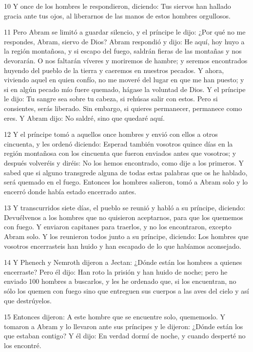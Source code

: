 \par 10 Y once de los hombres le respondieron, diciendo: Tus siervos han hallado gracia ante tus ojos, al liberarnos de las manos de estos hombres orgullosos.

\par 11 Pero Abram se limitó a guardar silencio, y el príncipe le dijo: ¿Por qué no me respondes, Abram, siervo de Dios? Abram respondió y dijo: He aquí, hoy huyo a la región montañosa, y si escapo del fuego, saldrán fieras de las montañas y nos devorarán. O nos faltarán víveres y moriremos de hambre; y seremos encontrados huyendo del pueblo de la tierra y caeremos en nuestros pecados. Y ahora, viviendo aquel en quien confío, no me moveré del lugar en que me han puesto; y si en algún pecado mío fuere quemado, hágase la voluntad de Dios. Y el príncipe le dijo: Tu sangre sea sobre tu cabeza, si rehúsas salir con estos. Pero si consientes, serás liberado. Sin embargo, si quieres permanecer, permanece como eres. Y Abram dijo: No saldré, sino que quedaré aquí.

\par 12 Y el príncipe tomó a aquellos once hombres y envió con ellos a otros cincuenta, y les ordenó diciendo: Esperad también vosotros quince días en la región montañosa con los cincuenta que fueron enviados antes que vosotros; y después volveréis y diréis: No los hemos encontrado, como dije a los primeros. Y sabed que si alguno transgrede alguna de todas estas palabras que os he hablado, será quemado en el fuego. Entonces los hombres salieron, tomó a Abram solo y lo encerró donde había estado encerrado antes.

\par 13 Y transcurridos siete días, el pueblo se reunió y habló a su príncipe, diciendo: Devuélvenos a los hombres que no quisieron aceptarnos, para que los quememos con fuego. Y enviaron capitanes para traerlos, y no los encontraron, excepto Abram solo. Y los reunieron todos junto a su príncipe, diciendo: Los hombres que vosotros encerrasteis han huido y han escapado de lo que habíamos aconsejado.

\par 14 Y Phenech y Nemroth dijeron a Jectan: ¿Dónde están los hombres a quienes encerraste? Pero él dijo: Han roto la prisión y han huido de noche; pero he enviado 100 hombres a buscarlos, y les he ordenado que, si los encuentran, no sólo los quemen con fuego sino que entreguen sus cuerpos a las aves del cielo y así que destrúyelos.

\par 15 Entonces dijeron: A este hombre que se encuentre solo, quememoslo. Y tomaron a Abram y lo llevaron ante sus príncipes y le dijeron: ¿Dónde están los que estaban contigo? Y él dijo: En verdad dormí de noche, y cuando desperté no los encontré.

